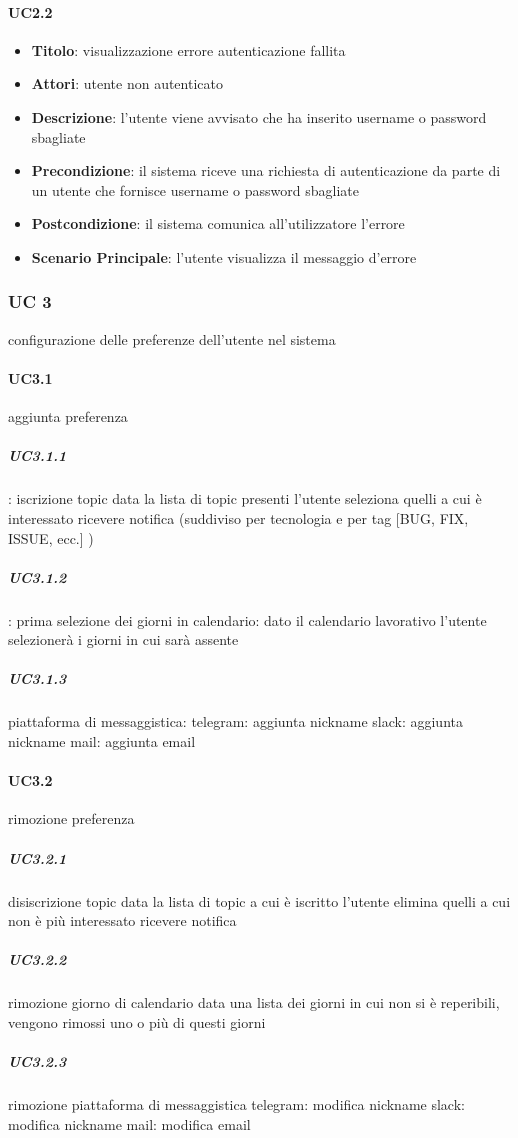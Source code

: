 	\paragraph{UC2.2}
		\begin{itemize}
			\item \textbf{Titolo}: visualizzazione errore autenticazione fallita
			\item \textbf{Attori}: utente non autenticato
			\item \textbf{Descrizione}: l'utente viene avvisato che ha inserito username o password sbagliate
			\item \textbf{Precondizione}: il sistema riceve una richiesta di autenticazione da parte di un utente che
			fornisce username o password sbagliate
			\item \textbf{Postcondizione}: il sistema comunica all'utilizzatore l'errore
			\item \textbf{Scenario Principale}: l'utente visualizza il messaggio d'errore
		\end{itemize}

\subsubsection{UC 3}
configurazione delle preferenze dell'utente nel sistema

	\paragraph{UC3.1}
	aggiunta preferenza
		\subparagraph{UC3.1.1}:
		iscrizione topic
			data la lista di topic presenti l'utente seleziona quelli a cui è interessato ricevere notifica (suddiviso per tecnologia e per tag [BUG, FIX, ISSUE, ecc.] )
		\subparagraph{UC3.1.2}:
		prima selezione dei giorni in calendario:
			dato il calendario lavorativo l'utente selezionerà i giorni in cui sarà assente
		\subparagraph{UC3.1.3}
		piattaforma di messaggistica:
			telegram: aggiunta nickname
			slack: aggiunta nickname
			mail: aggiunta email

	\paragraph{UC3.2}
	rimozione preferenza
		\subparagraph{UC3.2.1}
		disiscrizione topic %
			data la lista di topic a cui è iscritto l'utente elimina quelli a cui non è più interessato ricevere notifica
		\subparagraph{UC3.2.2}
		rimozione giorno di calendario
			data una lista dei giorni in cui non si è reperibili, vengono rimossi uno o più di questi giorni
		\subparagraph{UC3.2.3}
		rimozione piattaforma di messaggistica %
			telegram: modifica nickname
			slack: modifica nickname
			mail: modifica email
			
